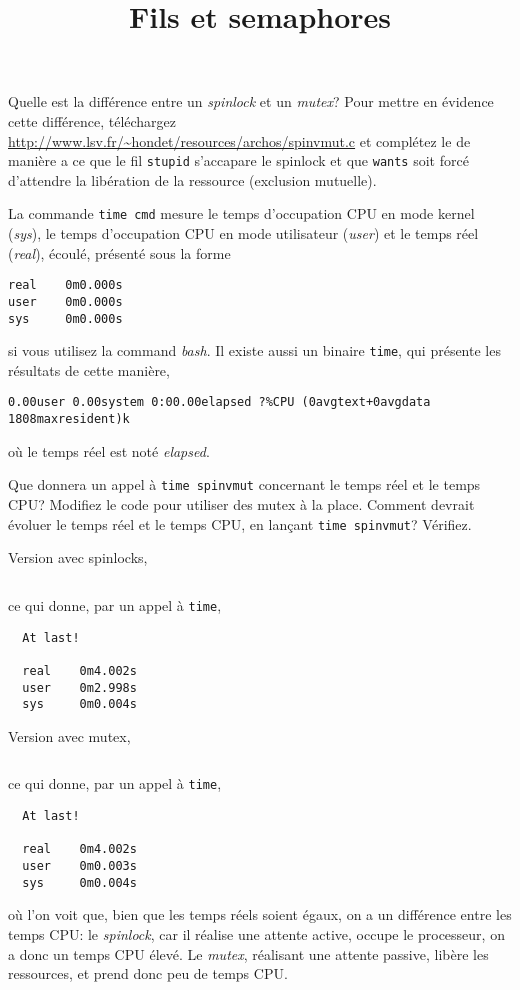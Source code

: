 \documentclass{exam}
\title{Fils et semaphores}
\begin{document}
\maketitle

\begin{questions}
Quelle est la différence entre un \textit{spinlock} et un
\textit{mutex}? Pour mettre en évidence cette différence, téléchargez
\url{http://www.lsv.fr/~hondet/resources/archos/spinvmut.c} et complétez le
de manière a ce que le fil \texttt{stupid} s'accapare le spinlock et
que \texttt{wants} soit forcé d'attendre la libération de la
ressource (exclusion mutuelle).

La commande \verb|time cmd| mesure le temps d'occupation CPU en mode kernel
(\textit{sys}), le  temps d'occupation CPU en mode utilisateur (\textit{user})
et le temps réel (\textit{real}),
écoulé, présenté sous la forme
\begin{verbatim}
real    0m0.000s
user    0m0.000s
sys     0m0.000s
\end{verbatim}
si vous utilisez la command \textit{bash}. Il existe aussi un binaire
\verb|time|, qui présente les résultats de cette manière,
\begin{verbatim}
0.00user 0.00system 0:00.00elapsed ?%CPU (0avgtext+0avgdata 1808maxresident)k
\end{verbatim}
où le temps réel est noté \textit{elapsed}.

Que donnera un appel à \verb|time spinvmut| concernant le temps réel et le temps
CPU? Modifiez le code pour utiliser des mutex à la place. Comment devrait
évoluer le temps réel et le temps CPU, en lançant \verb|time spinvmut|?
Vérifiez.

\begin{solution}
  Version avec spinlocks,
  \inputminted{C}{corrected/spinvmut.c}
  ce qui donne, par un appel à \verb|time|,
  \begin{verbatim}
  At last!

  real    0m4.002s
  user    0m2.998s
  sys     0m0.004s
  \end{verbatim}
  Version avec mutex,
  \inputminted{C}{corrected/spinvmut_mut.c}
  ce qui donne, par un appel à \verb|time|,
  \begin{verbatim}
  At last!

  real    0m4.002s
  user    0m0.003s
  sys     0m0.004s
  \end{verbatim}
  où l'on voit que, bien que les temps réels soient égaux, on a un différence
  entre les temps CPU: le \textit{spinlock}, car il réalise une attente active,
  occupe le processeur, on a donc un temps CPU élevé. Le \textit{mutex}, réalisant
  une attente passive, libère les ressources, et prend donc peu de temps CPU.
\end{solution}


\end{questions}
\end{document}
